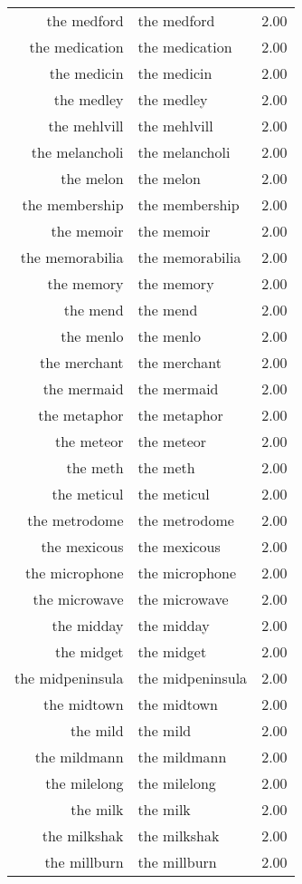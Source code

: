 \begin{table}[ht]
\begin{tabular}{rlr}
  the medford & the medford & 2.00 \\ 
  the medication & the medication & 2.00 \\ 
  the medicin & the medicin & 2.00 \\ 
  the medley & the medley & 2.00 \\ 
  the mehlvill & the mehlvill & 2.00 \\ 
  the melancholi & the melancholi & 2.00 \\ 
  the melon & the melon & 2.00 \\ 
  the membership & the membership & 2.00 \\ 
  the memoir & the memoir & 2.00 \\ 
  the memorabilia & the memorabilia & 2.00 \\ 
  the memory & the memory & 2.00 \\ 
  the mend & the mend & 2.00 \\ 
  the menlo & the menlo & 2.00 \\ 
  the merchant & the merchant & 2.00 \\ 
  the mermaid & the mermaid & 2.00 \\ 
  the metaphor & the metaphor & 2.00 \\ 
  the meteor & the meteor & 2.00 \\ 
  the meth & the meth & 2.00 \\ 
  the meticul & the meticul & 2.00 \\ 
  the metrodome & the metrodome & 2.00 \\ 
  the mexicous & the mexicous & 2.00 \\ 
  the microphone & the microphone & 2.00 \\ 
  the microwave & the microwave & 2.00 \\ 
  the midday & the midday & 2.00 \\ 
  the midget & the midget & 2.00 \\ 
  the midpeninsula & the midpeninsula & 2.00 \\ 
  the midtown & the midtown & 2.00 \\ 
  the mild & the mild & 2.00 \\ 
  the mildmann & the mildmann & 2.00 \\ 
  the milelong & the milelong & 2.00 \\ 
  the milk & the milk & 2.00 \\ 
  the milkshak & the milkshak & 2.00 \\ 
  the millburn & the millburn & 2.00 \\ 

\end{tabular}
\end{table}
